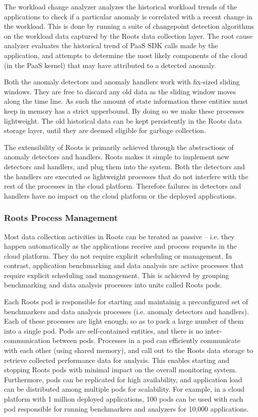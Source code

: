 The workload change analyzer analyzes the historical workload trends of the applications to
check if a particular anomaly is correlated with a recent change in the workload.
This is done by running a suite of changepoint detection algorithms on the workload
data captured by the Roots data collection layer. The root cause analyzer evaluates
the historical trend of PaaS SDK calls made by the application, and attempts to
determine the most likely components of the cloud (in the PaaS kernel) that may have 
attributed to a detected anomaly.

Both the anomaly detectors and anomaly handlers work with fix-sized sliding windows.
They are free to discard any old data as the sliding window moves along the time line.
As such the amount of state information these entities must keep in memory has
a strict upperbound. By doing so we make these processes lightweight. The old 
historical data can be kept persistently in the Roots data storage layer, until
they are deemed eligible for garbage collection.

The extensibility of Roots is primarily achieved through the abstractions of anomaly
detectors and handlers. Roots makes it simple to implement new detectors and handlers,
and plug them into the system. Both the detectors and the handlers are executed
as lightweight processes that do not interfere with the rest of the processes in
the cloud platform. Therefore failures in detectors and handlers have no impact
on the cloud platform or the deployed applications.

\subsubsection{Roots Process Management}
Most data collection activities in Roots can be treated as passive -- i.e. they
happen automatically as the applications receive and process requests in the cloud
platform. They do not require explicit scheduling or management. In contrast,
application benchmarking and data analysis are active processes that require
explicit scheduling and management.  This is achieved by grouping benchmarking
and data analysis processes into units called Roots pods. 

Each Roots pod is responsible for starting and maintainig a preconfigured set of
benchmarkers and data analysis processes (i.e. anomaly detectors and handlers). 
Each of these processes are light enough, so as to pack a large number of them
into a single pod. Pods are self-contained entities, and there is no inter-communication
between pods. Processes in a pod can efficiently communicate with each other 
(using shared memory), and call out to the Roots data storage to retrieve 
collected performance data for analysis. This enables starting and stopping 
Roots pods with minimal impact on the overall monitoring system. Furthermore, pods
can be replicated for high availability, and application load can be distributed
among multiple pods for scalability. For example, in a cloud platform with
1 million deployed applications, 100 pods can be used with each pod responsible
for running benchmarkers and analyzers for 10,000 applications.

